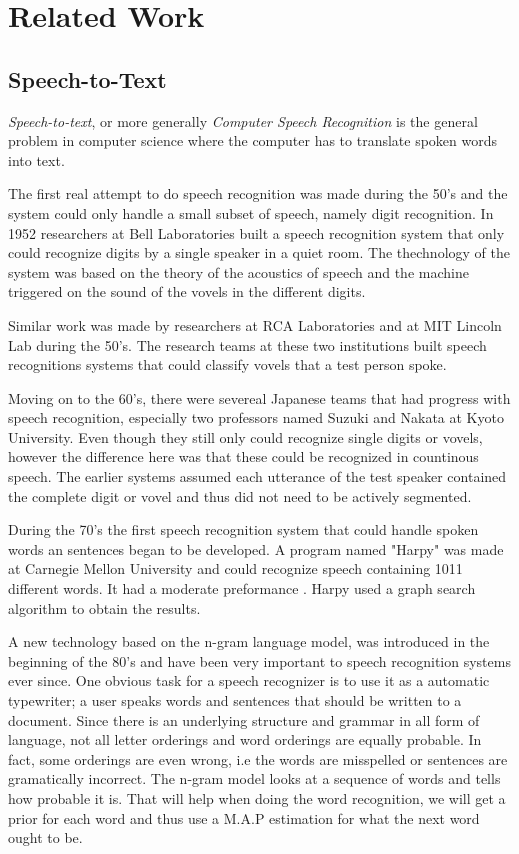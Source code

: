 \documentclass[a4paper,12pt,twoside]{ltxdoc}
\begin{document}
\section{Related Work}
\subsection{Speech-to-Text}
\emph{Speech-to-text}, or more generally \emph{Computer Speech Recognition} is the general problem in computer science where the computer has to translate spoken words into text.

The first real attempt to do speech recognition was made during the 50's and the system could only handle a small subset of speech, namely digit recognition. In 1952 researchers at Bell Laboratories built a speech recognition system that only could recognize digits by a single speaker in a quiet room. The thechnology of  the system was based on the theory of the acoustics of speech and the machine triggered on the sound of the vovels in the different digits.

Similar work was made by researchers at RCA Laboratories and at MIT Lincoln Lab during the 50's. The research teams at these two institutions built speech recognitions systems that could classify vovels that a test person spoke.

Moving on to the 60's, there were severeal Japanese teams that had progress with speech recognition, especially two professors named Suzuki and Nakata at Kyoto University. Even though they still only could recognize single digits or vovels, however the difference here was that these could be recognized in countinous speech. The earlier systems assumed each utterance of the test speaker contained the complete digit or vovel and thus did not need to be actively segmented.  

During the 70's the first speech recognition system that could handle spoken words an sentences began to be developed. A program named "Harpy" was made at Carnegie Mellon University and could recognize speech containing 1011 different words. It had a moderate preformance . Harpy used a graph search algorithm to obtain the results. 

A new technology based on the n-gram language model, was introduced in the beginning of the 80's and have been very important to speech recognition systems ever since. One obvious task for a speech recognizer is to use it as a automatic typewriter; a user speaks words and sentences that should be written to a document. Since there is an underlying structure and grammar in all form of language, not all letter orderings and word orderings are equally probable. In fact, some orderings are even wrong, i.e the words are misspelled or sentences are gramatically incorrect. The n-gram model looks at a sequence of words and tells how probable it is. That will help when doing the word recognition, we will get a prior for each word and thus use a M.A.P estimation for what the next word ought to be.
\end{document}
